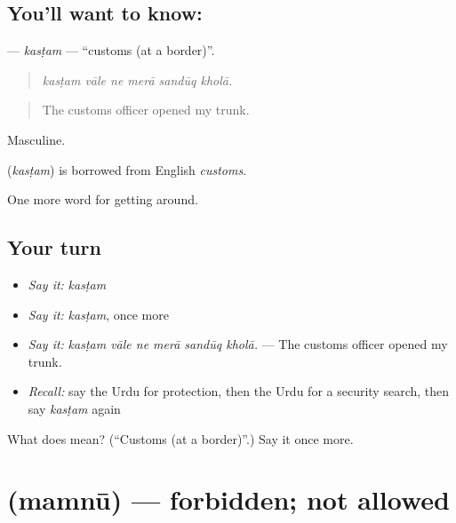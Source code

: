\subsection*{You'll want to know: }
\textbf{} — \emph{kasṭam} — \textquotedblleft{}customs (at a border)\textquotedblright{}.

\begin{quote}
     
\end{quote}

\begin{quote}
\emph{kasṭam vāle ne merā sandūq kholā.}
\end{quote}

\begin{quote}
The customs officer opened my trunk.
\end{quote}

Masculine.

\begin{cousinweb}
\textbf{} (\emph{kasṭam}) is borrowed from English \emph{customs}.
\end{cousinweb}

\begin{grammarlens}[title={What you've built}]
One more word for getting around.
\end{grammarlens}

\subsection*{Your turn}
\begin{itemize}
\raggedright
  \item \emph{Say it:} \emph{kasṭam}
  \item \emph{Say it:} \emph{kasṭam}, once more
  \item \emph{Say it:} \emph{kasṭam vāle ne merā sandūq kholā.} — The customs officer opened my trunk.
  \item \emph{Recall:} say the Urdu for protection, then the Urdu for a security search, then say \emph{kasṭam} again
\end{itemize}

\begin{tcolorbox}[breakable,colback=teal!4,colframe=teal!35!black,title={Before you move on}]
What does  mean? (\textquotedblleft{}Customs (at a border)\textquotedblright{}.) Say it once more.
\end{tcolorbox}
\section[\texorpdfstring{\ur{ممنوع} (mamnū)}{ممنوع (mamnū)}]{ (mamnū) — forbidden; not allowed}

